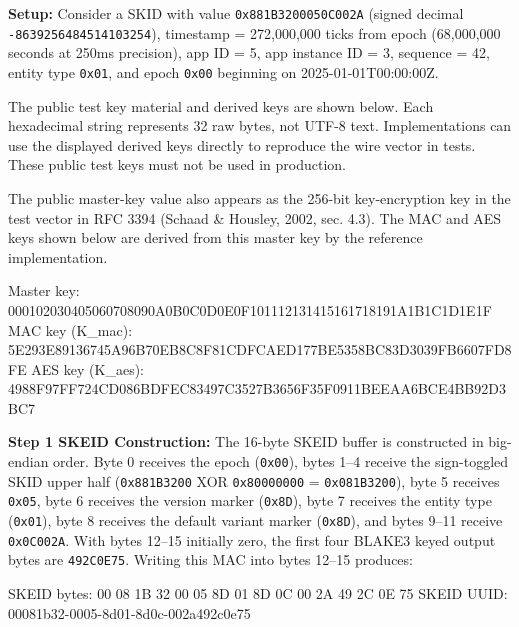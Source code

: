 \documentclass[fleqn,10pt]{wlpeerj}
\newenvironment{Shaded}{}{}
\newcommand{\NormalTok}[1]{#1}
\begin{document}
\textbf{Setup:} Consider a SKID with value \texttt{0x881B3200050C002A}
(signed decimal \texttt{-8639256484514103254}), timestamp = 272,000,000
ticks from epoch (68,000,000 seconds at 250ms precision), app ID = 5,
app instance ID = 3, sequence = 42, entity type \texttt{0x01}, and epoch
\texttt{0x00} beginning on 2025-01-01T00:00:00Z.

The public test key material and derived keys are shown below. Each
hexadecimal string represents 32 raw bytes, not UTF-8 text.
Implementations can use the displayed derived keys directly to reproduce
the wire vector in tests. These public test keys must not be used in
production.

The public master-key value also appears as the 256-bit key-encryption
key in the test vector in RFC 3394 (Schaad \& Housley, 2002, sec. 4.3).
The MAC and AES keys shown below are derived from this master key by the
reference implementation.

\begin{Shaded}
\begin{Highlighting}[]
\NormalTok{Master key:}
\NormalTok{000102030405060708090A0B0C0D0E0F101112131415161718191A1B1C1D1E1F}
\NormalTok{MAC key (K\_mac):}
\NormalTok{5E293E89136745A96B70EB8C8F81CDFCAED177BE5358BC83D3039FB6607FD8FE}
\NormalTok{AES key (K\_aes):}
\NormalTok{4988F97FF724CD086BDFEC83497C3527B3656F35F0911BEEAA6BCE4BB92D3BC7}
\end{Highlighting}
\end{Shaded}

\textbf{Step 1 SKEID Construction:} The 16-byte SKEID buffer is
constructed in big-endian order. Byte 0 receives the epoch
(\texttt{0x00}), bytes 1--4 receive the sign-toggled SKID upper half
(\texttt{0x881B3200} XOR \texttt{0x80000000} = \texttt{0x081B3200}),
byte 5 receives \texttt{0x05}, byte 6 receives the version marker
(\texttt{0x8D}), byte 7 receives the entity type (\texttt{0x01}), byte 8
receives the default variant marker (\texttt{0x8D}), and bytes 9--11
receive \texttt{0x0C002A}. With bytes 12--15 initially zero, the first
four BLAKE3 keyed output bytes are \texttt{492C0E75}. Writing this MAC
into bytes 12--15 produces:

\begin{Shaded}
\begin{Highlighting}[]
\NormalTok{SKEID bytes: 00 08 1B 32 00 05 8D 01 8D 0C 00 2A 49 2C 0E 75}
\NormalTok{SKEID UUID:  00081b32{-}0005{-}8d01{-}8d0c{-}002a492c0e75}
\end{Highlighting}
\end{Shaded}
\end{document}
